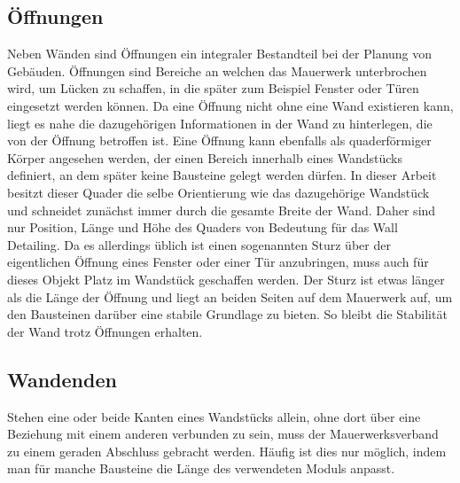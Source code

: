 \subsection{Öffnungen}\label{concept:openings}
Neben Wänden sind Öffnungen ein integraler Bestandteil bei der Planung von Gebäuden.
Öffnungen sind Bereiche an welchen das Mauerwerk unterbrochen wird, um Lücken zu schaffen, in die später zum Beispiel Fenster oder Türen eingesetzt werden können.
Da eine Öffnung nicht ohne eine Wand existieren kann, liegt es nahe die dazugehörigen Informationen in der Wand zu hinterlegen, die von der Öffnung betroffen ist.
Eine Öffnung kann ebenfalls als quaderförmiger Körper angesehen werden, der einen Bereich innerhalb eines Wandstücks definiert, an dem später keine Bausteine gelegt werden dürfen.
In dieser Arbeit besitzt dieser Quader die selbe Orientierung wie das dazugehörige Wandstück und schneidet zunächst immer durch die gesamte Breite der Wand.
Daher sind nur Position, Länge und Höhe des Quaders von Bedeutung für das Wall Detailing.
Da es allerdings üblich ist einen sogenannten Sturz über der eigentlichen Öffnung eines Fenster oder einer Tür anzubringen, muss auch für dieses Objekt Platz im Wandstück geschaffen werden. 
Der Sturz ist etwas länger als die Länge der Öffnung und liegt an beiden Seiten auf dem Mauerwerk auf, um den Bausteinen darüber eine stabile Grundlage zu bieten.
So bleibt die Stabilität der Wand trotz Öffnungen erhalten.

\subsection{Wandenden}\label{concept:wandende}
Stehen eine oder beide Kanten eines Wandstücks allein, ohne dort über eine Beziehung mit einem anderen verbunden zu sein, muss der Mauerwerksverband zu einem geraden Abschluss gebracht werden.
Häufig ist dies nur möglich, indem man für manche Bausteine die Länge des verwendeten Moduls anpasst.

